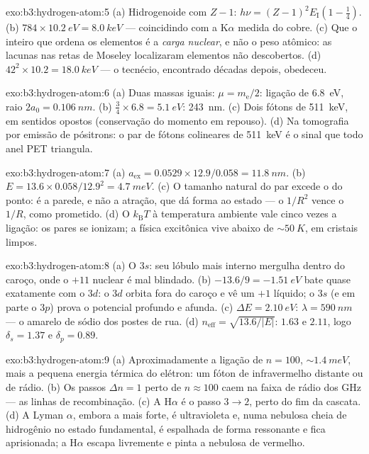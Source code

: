 \begin{solution}{exo:b3:hydrogen-atom:5}
(a) Hidrogenoide com $Z - 1$: $h\nu = (Z-1)^2E_{\text{I}}(1 -
\tfrac14)$. (b) $784 \times \qty{10.2}{eV} = \qty{8.0}{keV}$ ---
coincidindo com a K$\alpha$ medida do cobre. (c) Que o inteiro que
ordena os elementos é a \emph{carga nuclear}, e não o peso atômico: as
lacunas nas retas de Moseley localizaram elementos não descobertos. (d)
$42^2 \times 10.2 = \qty{18.0}{keV}$ --- o tecnécio, encontrado décadas
depois, obedeceu.
\end{solution}

\begin{solution}{exo:b3:hydrogen-atom:6}
(a) Duas massas iguais: $\mu = m_{\text{e}}/2$: ligação de
\qty{6.8}{eV}, raio $2a_0 = \qty{0.106}{nm}$. (b) $\tfrac34
\times 6.8 = \qty{5.1}{eV}$: \qty{243}{nm}. (c) Dois fótons de
\qty{511}{keV}, em sentidos opostos (conservação do momento em
repouso). (d) Na tomografia por emissão de pósitrons: o par de fótons
colineares de \qty{511}{keV} é o sinal que todo anel PET triangula.
\end{solution}

\begin{solution}{exo:b3:hydrogen-atom:7}
(a) $a_{\text{ex}} = 0.0529 \times 12.9/0.058 = \qty{11.8}{nm}$.
(b) $E = 13.6 \times 0.058/12.9^2 = \qty{4.7}{meV}$. (c) O tamanho
natural do par excede o do ponto: é a parede, e não a atração, que dá
forma ao estado --- o $1/R^2$ vence o $1/R$, como prometido. (d) O
$k_{\text{B}}T$ à temperatura ambiente vale cinco vezes a ligação: os
pares se ionizam; a física excitônica vive abaixo de
$\sim\qty{50}{K}$, em cristais limpos.
\end{solution}

\begin{solution}{exo:b3:hydrogen-atom:8}
(a) O $3s$: seu lóbulo mais interno mergulha dentro do caroço, onde o
$+11$ nuclear é mal blindado. (b) $-13.6/9 = \qty{-1.51}{eV}$ bate
quase exatamente com o $3d$: o $3d$ orbita fora do caroço e vê um
$+1$ líquido; o $3s$ (e em parte o $3p$) prova o potencial profundo e
afunda. (c) $\Delta E = \qty{2.10}{eV}$: $\lambda = \qty{590}{nm}$
--- o amarelo de sódio dos postes de rua. (d) $n_{\text{eff}} =
\sqrt{13.6/|E|}$: $1.63$ e $2.11$, logo $\delta_s = 1.37$ e
$\delta_p = 0.89$.
\end{solution}

\begin{solution}{exo:b3:hydrogen-atom:9}
(a) Aproximadamente a ligação de $n = 100$, $\sim\qty{1.4}{meV}$, mais
a pequena energia térmica do elétron: um fóton de infravermelho
distante ou de rádio. (b) Os passos $\Delta n = 1$ perto de
$n \approx 100$ caem na faixa de rádio dos GHz --- as linhas de
recombinação. (c) A H$\alpha$ é o passo $3 \to
2$, perto do fim da cascata. (d) A Lyman $\alpha$, embora a mais forte,
é ultravioleta e, numa nebulosa cheia de hidrogênio no estado
fundamental, é espalhada de forma ressonante e fica aprisionada; a
H$\alpha$ escapa livremente e pinta a nebulosa de vermelho.
\end{solution}

